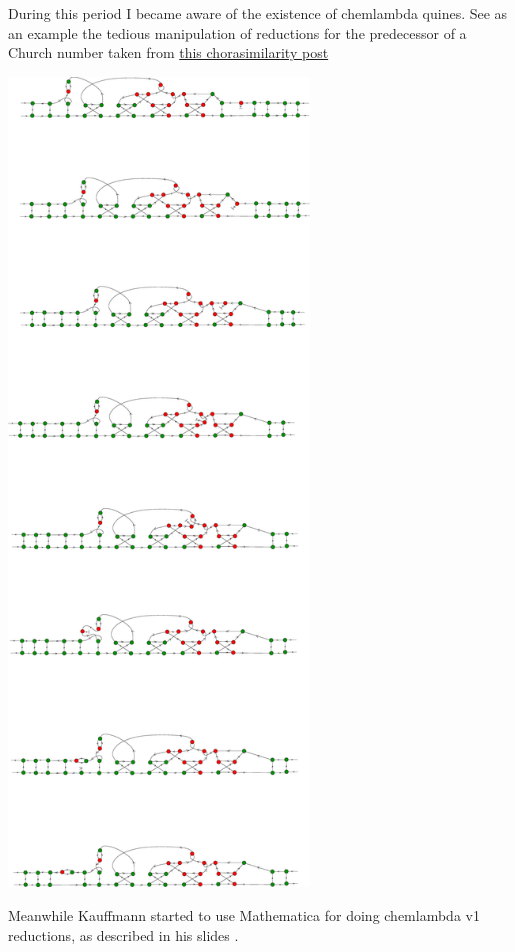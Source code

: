 \documentclass{article}
\begin{document}
During this period I became aware of the existence of chemlambda quines. See as an example the tedious manipulation of reductions for the predecessor of a Church number taken from \href{https://chorasimilarity.wordpress.com/2014/08/27/ouroboros-predecessor-iii-the-walking-machine/}{this chorasimilarity post}
\vspace{.5cm}


\vspace{.5cm}
 
\centerline{\includegraphics[width=0.6\textwidth]{../img/chemical-concrete-machine/pred_round_9.jpg}
}
\vspace{.5cm}
Meanwhile Kauffmann started to use Mathematica for doing chemlambda v1 reductions, as described in his slides \cite{kauffmanslides}. 
\end{document}
